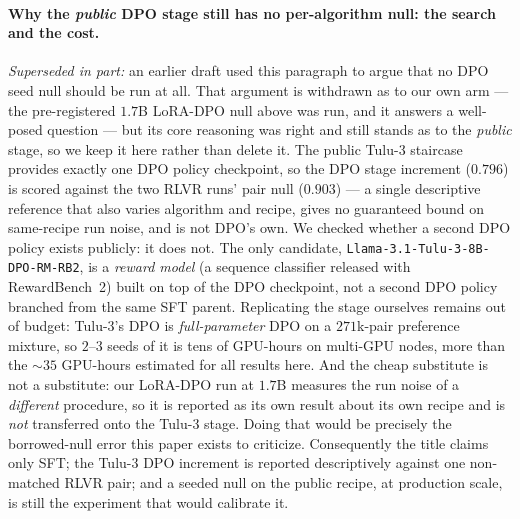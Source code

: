 \documentclass{article}
\begin{document}
\paragraph{Why the \emph{public} DPO stage still has no per-algorithm null: the search and the cost.}
\emph{Superseded in part:} an earlier draft used this paragraph to argue that no DPO seed null should be run at all. That argument is withdrawn as to our own arm --- the pre-registered $1.7$B LoRA-DPO null above was run, and it answers a well-posed question --- but its core reasoning was right and still stands as to the \emph{public} stage, so we keep it here rather than delete it. The public Tulu-3 staircase provides exactly one DPO policy checkpoint, so the DPO stage increment ($0.796$) is scored against the two RLVR runs' pair null ($0.903$) --- a single descriptive reference that also varies algorithm and recipe, gives no guaranteed bound on same-recipe run noise, and is not DPO's own. We checked whether a second DPO policy exists publicly: it does not. The only candidate, \texttt{Llama-3.1-Tulu-3-8B-DPO-RM-RB2}, is a \emph{reward model} (a sequence classifier released with RewardBench~2) built on top of the DPO checkpoint, not a second DPO policy branched from the same SFT parent. Replicating the stage ourselves remains out of budget: Tulu-3's DPO is \emph{full-parameter} DPO on a $271$k-pair preference mixture, so $2$--$3$ seeds of it is tens of GPU-hours on multi-GPU nodes, more than the ${\sim}35$ GPU-hours estimated for all results here. And the cheap substitute is not a substitute: our LoRA-DPO run at $1.7$B measures the run noise of a \emph{different} procedure, so it is reported as its own result about its own recipe and is \emph{not} transferred onto the Tulu-3 stage. Doing that would be precisely the borrowed-null error this paper exists to criticize. Consequently the title claims only SFT; the Tulu-3 DPO increment is reported descriptively against one non-matched RLVR pair; and a seeded null on the public recipe, at production scale, is still the experiment that would calibrate it.
\end{document}
